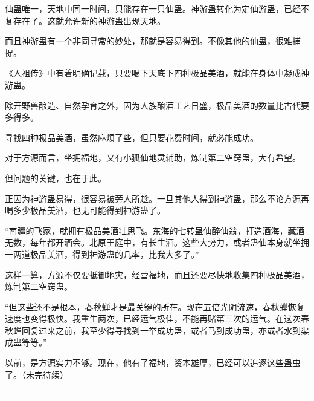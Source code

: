 \begin{this_body}
仙蛊唯一，天地中同一时间，只能存在一只仙蛊。神游蛊转化为定仙游蛊，已经不复存在了。这就允许新的神游蛊出现天地。

而且神游蛊有一个非同寻常的妙处，那就是容易得到。不像其他的仙蛊，很难捕捉。

《人祖传》中有着明确记载，只要喝下天底下四种极品美酒，就能在身体中凝成神游蛊。

除开野兽酿造、自然孕育之外，因为人族酿酒工艺日盛，极品美酒的数量比古代要多得多。

寻找四种极品美酒，虽然麻烦了些，但只要花费时间，就必能成功。

对于方源而言，坐拥福地，又有小狐仙地灵辅助，炼制第二空窍蛊，大有希望。

但问题的关键，也在于此。

正因为神游蛊易得，很容易被旁人所趁。一旦其他人得到神游蛊，那么不论方源再喝多少极品美酒，也无可能得到神游蛊了。

“南疆的飞家，就拥有极品美酒壮思飞。东海的七转蛊仙醉仙翁，打造酒海，藏酒无数，每年都开酒会。北原王庭中，有长生酒。这些大势力，或者蛊仙本身就坐拥一两道极品美酒，得到神游蛊的几率，比我大多了。”

这样一算，方源不仅要抵御地灾，经营福地，而且还要尽快地收集四种极品美酒，炼制第二空窍蛊。

“但这些还不是根本，春秋蝉才是最关键的所在。现在五倍光阴流速，春秋蝉恢复速度也变得极快。我重生两次，已经运气极佳，不能再赌第三次的运气。在这次春秋蝉回复过来之前，我至少得寻找到一举成功蛊，或者马到成功蛊，亦或者水到渠成蛊等等。”

以前，是方源实力不够。现在，他有了福地，资本雄厚，已经可以追逐这些蛊虫了。（未完待续）

------------

\end{this_body}

